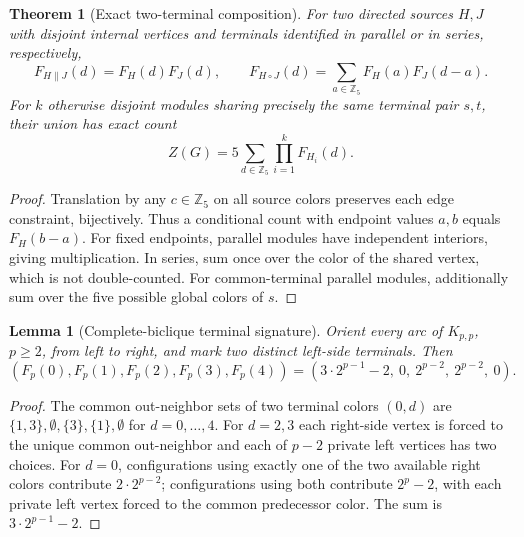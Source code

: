 \documentclass[11pt]{article}
\newtheorem{theorem}{Theorem}
\newtheorem{lemma}{Lemma}
\begin{document}
\begin{theorem}[Exact two-terminal composition]
For two directed sources $H,J$ with disjoint internal vertices
and terminals identified in parallel or in series, respectively,
\[
F_{H\parallel J}(d)=F_H(d)F_J(d),\qquad
F_{H\circ J}(d)=\sum_{a\in\mathbb Z_5}F_H(a)F_J(d-a).
\]
For $k$ otherwise disjoint modules sharing precisely the same
terminal pair $s,t$, their union has exact count
\[
 Z(G)=5\sum_{d\in\mathbb Z_5}\prod_{i=1}^{k}F_{H_i}(d).
\]
\end{theorem}
\begin{proof}
Translation by any $c\in\mathbb Z_5$ on all source colors preserves
each edge constraint, bijectively. Thus a conditional count with
endpoint values $a,b$ equals $F_H(b-a)$. For fixed endpoints,
parallel modules have independent interiors, giving multiplication.
In series, sum once over the color of the shared vertex, which is
not double-counted. For common-terminal parallel modules, additionally
sum over the five possible global colors of $s$.
\end{proof}

\begin{lemma}[Complete-biclique terminal signature]
Orient every arc of $K_{p,p}$, $p\ge2$, from left to right,
and mark two distinct left-side terminals. Then
\[
(F_p(0),F_p(1),F_p(2),F_p(3),F_p(4))=
(3\cdot2^{p-1}-2,\ 0,\ 2^{p-2},\ 2^{p-2},\ 0).
\]
\end{lemma}
\begin{proof}
The common out-neighbor sets of two terminal colors $(0,d)$ are
$\{1,3\},\emptyset,\{3\},\{1\},\emptyset$ for $d=0,\ldots,4$.
For $d=2,3$ each right-side vertex is forced to the unique
common out-neighbor and each of $p-2$ private left vertices has two
choices. For $d=0$, configurations using exactly one of the two
available right colors contribute $2\cdot 2^{p-2}$; configurations
using both contribute $2^p-2$, with each private left vertex forced
to the common predecessor color. The sum is $3\cdot 2^{p-1}-2$.
\end{proof}
\end{document}
